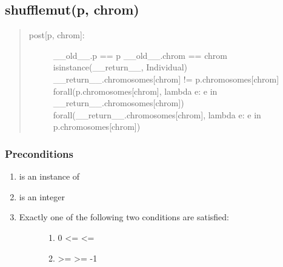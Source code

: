 \documentclass[letterpaper,10pt,english]{sphinxmanual}
\begin{document}
\subsection{shufflemut(p, chrom)}
\label{contracts:shufflemut-p-chrom}\begin{quote}
\begin{description}
\item[{post{[}p, chrom{]}:}] \leavevmode
\_\_old\_\_.p == p
\_\_old\_\_.chrom == chrom
isinstance(\_\_return\_\_, Individual)
\_\_return\_\_.chromosomes{[}chrom{]} != p.chromosomes{[}chrom{]}
forall(p.chromosomes{[}chrom{]}, lambda e: e in \_\_return\_\_.chromosomes{[}chrom{]})
forall(\_\_return\_\_.chromosomes{[}chrom{]}, lambda e: e in p.chromosomes{[}chrom{]})

\end{description}
\end{quote}


\subsubsection{Preconditions}
\label{contracts:id45}\begin{enumerate}
\item {} 
 is an instance of 

\item {} 
 is an integer

\item {} \begin{description}
\item[{Exactly one of the following two conditions are satisfied:}] \leavevmode\begin{enumerate}
\item {} 
0 \textless{}=  \textless{}= 

\item {} 
 \textgreater{}=  \textgreater{}= -1

\end{enumerate}

\end{description}

\end{enumerate}
\end{document}
